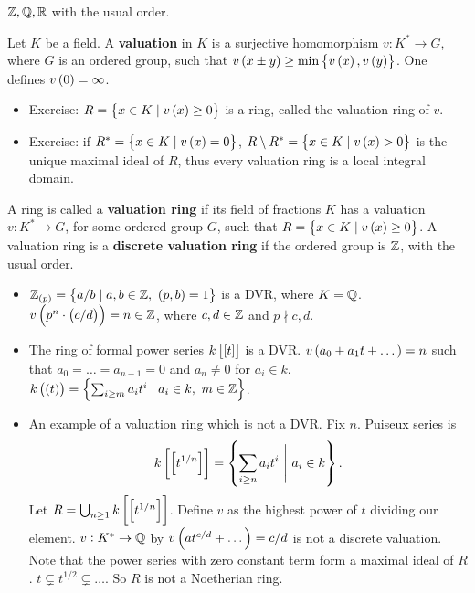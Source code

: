 \begin{example*}
$ \mathbb{Z}, \mathbb{Q}, \mathbb{R} $ with the usual order.
\end{example*}

\begin{definition}
Let $ K $ be a field. A \textbf{valuation} in $ K $ is a surjective homomorphism $ v : K^* \to G $, where $ G $ is an ordered group, such that $ v\br{x \pm y} \ge \min\cbr{v\br{x}, v\br{y}} $. One defines $ v\br{0} = \infty $.
\begin{itemize}
\item Exercise: $ R = \cbr{x \in K \mid v\br{x} \ge 0} $ is a ring, called the valuation ring of $ v $.
\item Exercise: if $ R^* = \cbr{x \in K \mid v\br{x} = 0} $, $ R \setminus R^* = \cbr{x \in K \mid v\br{x} > 0} $ is the unique maximal ideal of $ R $, thus every valuation ring is a local integral domain.
\end{itemize}
\end{definition}

\begin{definition}
A ring is called a \textbf{valuation ring} if its field of fractions $ K $ has a valuation $ v : K^* \to G $, for some ordered group $ G $, such that $ R = \cbr{x \in K \mid v\br{x} \ge 0} $. A valuation ring is a \textbf{discrete valuation ring} if the ordered group is $ \mathbb{Z} $, with the usual order.
\end{definition}

\pagebreak

\begin{example*}
\hfill
\begin{itemize}
\item $ \Z_{\br{p}} = \cbr{a / b \mid a, b \in \Z, \ \br{p, b} = 1} $ is a DVR, where $ K = \mathbb{Q} $. $ v\br{p^n \cdot \br{c / d}} = n \in \Z $, where $ c, d \in \mathbb{Z} $ and $ p \nmid c, d $.
\item The ring of formal power series $ k\sbr{\sbr{t}} $ is a DVR. $ v\br{a_0 + a_1t + \dots} = n $ such that $ a_0 = \dots = a_{n - 1} = 0 $ and $ a_n \ne 0 $ for $ a_i \in k $. $ k\br{\br{t}} = \cbr{\sum_{i \ge m} a_it^i \mid a_i \in k, \ m \in \Z} $.
\item An example of a valuation ring which is not a DVR. Fix $ n $. Puiseux series is
$$ k\sbr{\sbr{t^{1 / n}}} = \cbr{\sum_{i \ge n} a_it^i \ \Bigg| \ a_i \in k}. $$
Let $ R = \bigcup_{n \ge 1} k\sbr{\sbr{t^{1 / n}}} $. Define $ v $ as the highest power of $ t $ dividing our element. $ v : K^* \to \mathbb{Q} $ by $ v\br{at^{c / d} + \dots} = c / d $ is not a discrete valuation. Note that the power series with zero constant term form a maximal ideal of $ R $. $ t \subsetneq t^{1 / 2} \subsetneq \dots $. So $ R $ is not a Noetherian ring.
\end{itemize}
\end{example*}

